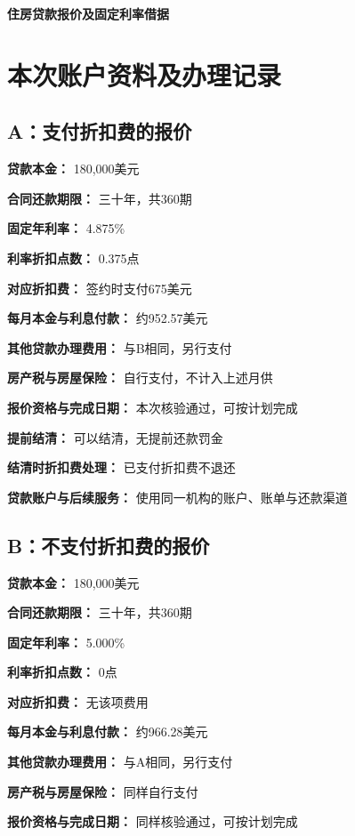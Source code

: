 \documentclass[UTF8,fontset=none,11pt,a4paper]{ctexart}
\begin{document}
{\noindent\LARGE\bfseries 住房贷款报价及固定利率借据\par}
\vspace{10pt}
\section*{本次账户资料及办理记录}
\subsection*{A：支付折扣费的报价}
\textbf{贷款本金：} 180,000美元


\textbf{合同还款期限：} 三十年，共360期


\textbf{固定年利率：} 4.875\%


\textbf{利率折扣点数：} 0.375点


\textbf{对应折扣费：} 签约时支付675美元


\textbf{每月本金与利息付款：} 约952.57美元


\textbf{其他贷款办理费用：} 与B相同，另行支付


\textbf{房产税与房屋保险：} 自行支付，不计入上述月供


\textbf{报价资格与完成日期：} 本次核验通过，可按计划完成


\textbf{提前结清：} 可以结清，无提前还款罚金


\textbf{结清时折扣费处理：} 已支付折扣费不退还


\textbf{贷款账户与后续服务：} 使用同一机构的账户、账单与还款渠道


\subsection*{B：不支付折扣费的报价}
\textbf{贷款本金：} 180,000美元


\textbf{合同还款期限：} 三十年，共360期


\textbf{固定年利率：} 5.000\%


\textbf{利率折扣点数：} 0点


\textbf{对应折扣费：} 无该项费用


\textbf{每月本金与利息付款：} 约966.28美元


\textbf{其他贷款办理费用：} 与A相同，另行支付


\textbf{房产税与房屋保险：} 同样自行支付


\textbf{报价资格与完成日期：} 同样核验通过，可按计划完成
\end{document}
